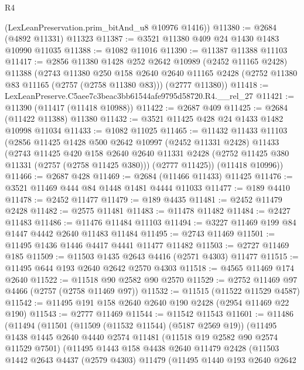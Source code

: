 \begin{lexlean}{R4}
\begin{coremodule}
      (LexLeanPreservation.prim_bitAnd_u8 @10976 @1416))
@11380 := @2684 (@4892 @11331) @11323
@11387 := @3521 @11380 @409 @24 @1430 @1483 @10990 @11035
@11388 := @1082 @11016
@11390 := @11387 @11388 @11103
@11417 := @2856
    @11380
    @1428
    @252
    @2642
    @10989
    (@2452 @11165 @2428)
    @11388
    (@2743
      @11380
      @250
      @158
      @2640
      @2640
      @11165
      @2428
      (@2752 @11380 @83 @11165 (@2757 (@2758 @11380 @83)))
      (@2777 @11380))
@11418 := LexLeanPreserve.C5aee7c3beac3bb61544afe9795d58720.R4.__rel_27
@11421 := @11390 (@11417 (@11418 @10988))
@11422 := @2687 @409
@11425 := @2684 (@11422 @11388) @11380
@11432 := @3521 @11425 @428 @24 @1433 @1482 @10998 @11034
@11433 := @1082 @11025
@11465 := @11432
    @11433
    @11103
    (@2856
      @11425
      @1428
      @500
      @2642
      @10997
      (@2452 @11331 @2428)
      @11433
      (@2743
        @11425
        @420
        @158
        @2640
        @2640
        @11331
        @2428
        (@2752 @11425 @380 @11331 (@2757 (@2758 @11425 @380)))
        (@2777 @11425))
      (@11418 @10996))
@11466 := @2687 @428
@11469 := @2684 (@11466 @11433) @11425
@11476 := @3521 @11469 @444 @84 @1448 @1481 @4444 @11033
@11477 := @189 @4410
@11478 := @2452 @11477
@11479 := @189 @4435
@11481 := @2452 @11479 @2428
@11482 := @2575 @11481
@11483 := @11478 @11482
@11484 := @2427 @11483
@11486 := @11476 @11484 @11103
@11494 := @3227 @11469 @199 @84 @1447 @4442 @2640 @11483 @11484
@11495 := @2743 @11469
@11501 := @11495 @1436 @1446 @4417 @4441 @11477 @11482
@11503 := @2727 @11469 @185
@11509 := @11503 @1435 @2643 @4416 (@2571 @4303) @11477
@11515 := @11495 @644 @193 @2640 @2642 @2570 @4303
@11518 := @4565 @11469 @174 @2640
@11522 := @11518 @90 @2582 @90 @2570
@11529 := @2752 @11469 @97 @4466 (@2757 (@2758 @11469 @97))
@11532 := @11515 (@11522 @11529 @4587)
@11542 := @11495 @191 @158 @2640 @2640 @190 @2428 (@2954 @11469 @22 @190)
@11543 := @2777 @11469
@11544 := @11542 @11543
@11601 := @11486
    (@11494
      (@11501
        (@11509 (@11532 @11544) (@5187 @2569 @19))
        (@11495
          @1438
          @1445
          @2640
          @4440
          @2574
          @11481
          (@11518 @19 @2582 @90 @2574 @11529 @7501)
          (@11495
            @1443
            @158
            @4438
            @2640
            @11479
            @2428
            (@11503
              @1442
              @2643
              @4437
              (@2579 @4303)
              @11479
              (@11495
                @1440
                @193
                @2640
                @2642

\end{coremodule}
\end{lexlean}
